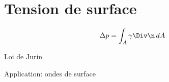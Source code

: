 \chapter{Tension de surface}

\begin{displaymath}
  \Delta p = \int_A \gamma \Div \n\,dA
\end{displaymath}

Loi de Jurin

Application: ondes de surface


